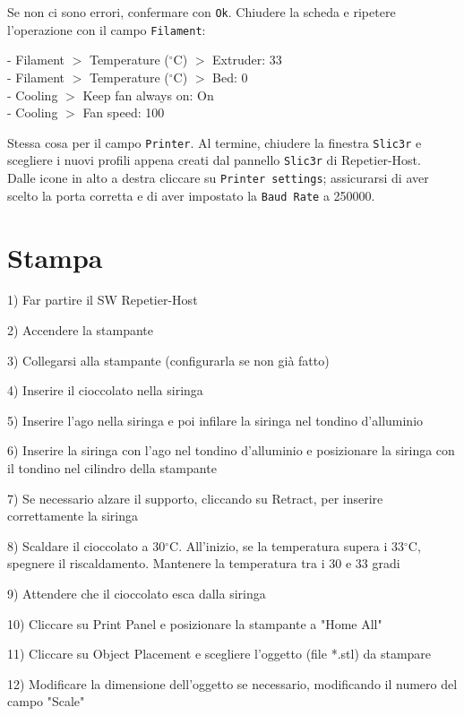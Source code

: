 \documentclass[12pt]{article}
\begin{document}
		Se non ci sono errori, confermare con \texttt{Ok}. Chiudere la scheda e ripetere l'operazione con il campo \texttt{Filament}:

		- Filament $>$ Temperature ($^{\circ}$C) $>$ Extruder: 33\\
		- Filament $>$ Temperature ($^{\circ}$C) $>$ Bed: 0\\
		- Cooling $>$ Keep fan always on: On\\
		- Cooling $>$ Fan speed: 100
		
		Stessa cosa per il campo \texttt{Printer}. Al termine, chiudere la finestra \texttt{Slic3r} e scegliere i nuovi profili appena creati dal pannello \texttt{Slic3r} di Repetier-Host.\\
		
		Dalle icone in alto a destra cliccare su \texttt{Printer settings}; assicurarsi di aver scelto la porta corretta e di aver impostato la \texttt{Baud Rate} a 250000.


\section{Stampa}

1) Far partire il SW Repetier-Host

2) Accendere la stampante

3) Collegarsi alla stampante (configurarla se non già fatto)

4) Inserire il cioccolato nella siringa

5) Inserire l'ago nella siringa e poi infilare la siringa nel tondino d'alluminio

6) Inserire la siringa con l'ago nel tondino d'alluminio e posizionare la siringa con il tondino nel cilindro della stampante

7) Se necessario alzare il supporto, cliccando su Retract, per inserire correttamente la siringa

8) Scaldare il cioccolato a 30$^{\circ}$C. All'inizio, se la temperatura supera i 33$^{\circ}$C, spegnere il riscaldamento. Mantenere la temperatura tra i 30 e 33 gradi

9) Attendere che il cioccolato esca dalla siringa

10) Cliccare su Print Panel e posizionare la stampante a "Home All"

11) Cliccare su Object Placement e scegliere l'oggetto (file *.stl) da stampare

12) Modificare la dimensione dell'oggetto se necessario, modificando il numero del campo "Scale"
\end{document}
